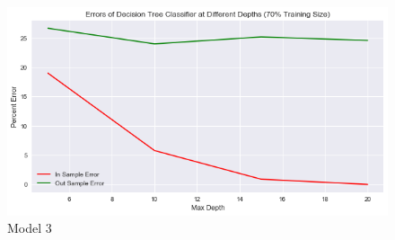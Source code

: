 \documentclass[10pt,twocolumn]{article}
\begin{document}
\begin{figure}[!t]
  \begin{center}
    \includegraphics[width=\textwidth,height=\textheight,keepaspectratio]{decision_tree_error_1.png}
  \end{center}

  \caption{\small Model 3}
  \label{fig-1}
\end{figure}
\end{document}

